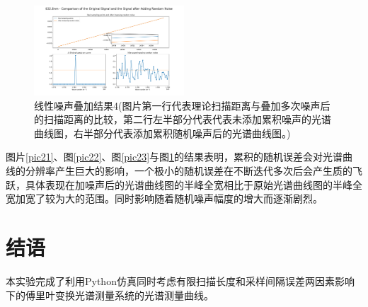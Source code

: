 \documentclass[conference]{IEEEtran}
\begin{document}
\begin{figure}[htbp]
    \centerline{\includegraphics[width=0.5\textwidth]{随机噪声叠加4.png}}
    \caption{线性噪声叠加结果4(图片第一行代表理论扫描距离与叠加多次噪声后的扫描距离的比较，第二行左半部分代表代表未添加累积噪声的光谱曲线图，右半部分代表添加累积随机噪声后的光谱曲线图。)}
    \label{pic24}
\end{figure}

图片\ref{pic21}、图\ref{pic22}、图\ref{pic23}与图\ref{pic24}的结果表明，累积的随机误差会对光谱曲线的分辨率产生巨大的影响，一个极小的随机误差在不断迭代多次后会产生质的飞跃，具体表现在加噪声后的光谱曲线图的半峰全宽相比于原始光谱曲线图的半峰全宽加宽了较为大的范围。同时影响随着随机噪声幅度的增大而逐渐剧烈。

\section{结语}
本实验完成了利用Python仿真同时考虑有限扫描长度和采样间隔误差两因素影响下的傅里叶变换光谱测量系统的光谱测量曲线。

\appendices
\end{document}
